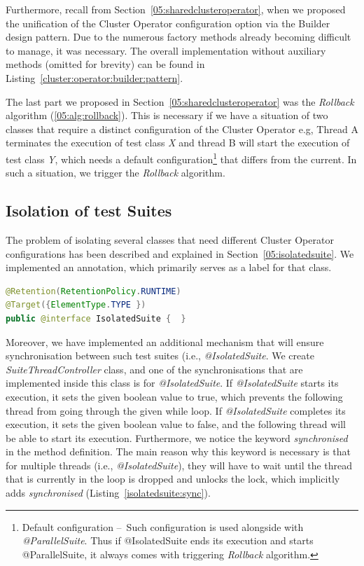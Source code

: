 Furthermore, recall from Section~\ref{05:sharedclusteroperator}, when we proposed the unification of the Cluster Operator configuration
option via the Builder design pattern.
Due to the numerous factory methods already becoming difficult to manage, it was necessary.
The overall implementation without auxiliary methods (omitted for brevity) can be found in Listing~\ref{cluster:operator:builder:pattern}.

The last part we proposed in Section~\ref{05:sharedclusteroperator} was the \emph{Rollback} algorithm (\ref{05:alg:rollback}).
This is necessary if we have a situation of two classes that require a distinct configuration of the Cluster Operator e.g,
Thread A terminates the execution of test class \emph{X} and thread B will start the execution of test class \emph{Y},
which needs a default configuration\footnote{Default configuration \---\ Such configuration is used alongside with \emph{@ParallelSuite}.
Thus if @IsolatedSuite ends its execution and starts @ParallelSuite, it always comes with triggering \emph{Rollback} algorithm.} that differs from the current.
In such a situation, we trigger the \emph {Rollback} algorithm.

\subsection{Isolation of test Suites}
\label{05:sub:sec:isolation:of:test:suites}

The problem of isolating several classes that need different Cluster Operator configurations has been described and explained in Section~\ref{05:isolatedsuite}.
We implemented an annotation, which primarily serves as a label for that class.
\begin{lstlisting}[language=Java,label=annotation:isolatedsuite,caption=Implementation of the @IsolatedSuite annotation,frame=tb]
@Retention(RetentionPolicy.RUNTIME)
@Target({ElementType.TYPE })
public @interface IsolatedSuite {  }
\end{lstlisting}
Moreover, we have implemented an additional mechanism that will ensure synchronisation between such test suites
(i.e., \emph{@IsolatedSuite}. We create \emph{SuiteThreadController} class, and one of the synchronisations that are
implemented inside this class is for \emph {@IsolatedSuite}. If \emph{@IsolatedSuite} starts its execution, it sets the given
boolean value to true, which prevents the following thread from going through the given while loop.
If \emph{@IsolatedSuite} completes its execution, it sets the given boolean value to false, and
the following thread will be able to start its execution. Furthermore, we notice the keyword \emph{synchronised}
in the method definition. The main reason why this keyword is necessary is that for multiple threads (i.e., \emph{@IsolatedSuite}),
they will have to wait until the thread that is currently in the loop is dropped and unlocks the lock, which implicitly
adds \emph {synchronised} (Listing~\ref{isolatedsuite:sync}).

